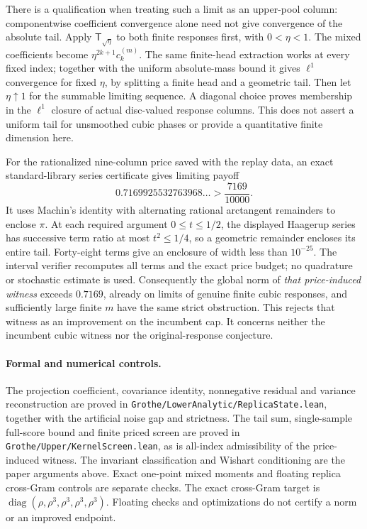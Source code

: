 \documentclass[11pt]{article}
\begin{document}
There is a qualification when treating such a limit as an upper-pool column:
componentwise coefficient convergence alone need not give convergence of the
absolute tail. Apply $\mathsf T_{\sqrt\eta}$ to both finite responses first,
with $0<\eta<1$. The mixed coefficients become
$\eta^{2k+1}c_k^{(m)}$. The same finite-head extraction works at every fixed
index; together with the uniform absolute-mass bound it gives $\ell^1$
convergence for fixed $\eta$, by splitting a finite head and a geometric tail.
Then let $\eta\uparrow1$ for the summable limiting sequence. A diagonal choice
proves membership in the $\ell^1$ closure of actual disc-valued response columns.
This does not assert a uniform tail for unsmoothed cubic phases or provide a
quantitative finite dimension here.

For the rationalized nine-column price saved with the replay data, an exact
standard-library series certificate gives limiting payoff
\[
 0.7169925532763968\ldots>\frac{7169}{10000}.
\]
It uses Machin's identity with alternating rational arctangent remainders to
enclose $\pi$. At each required argument $0\le t\le1/2$, the displayed
Haagerup series has successive term ratio at most $t^2\le1/4$, so a geometric
remainder encloses its entire tail. Forty-eight terms give an enclosure of
width less than $10^{-25}$. The interval verifier recomputes all terms and
the exact price budget; no quadrature or stochastic estimate is used.
Consequently the global norm of \emph{that price-induced witness} exceeds
$0.7169$, already on limits of genuine finite cubic responses, and sufficiently
large finite $m$ have the same strict obstruction. This rejects that witness
as an improvement on the incumbent cap. It concerns neither the incumbent
cubic witness nor the original-response conjecture.

\paragraph{Formal and numerical controls.}
The projection coefficient, covariance identity, nonnegative residual and
variance reconstruction are proved in
\texttt{Grothe/LowerAnalytic/ReplicaState.lean}, together with the artificial
noise gap and strictness. The tail sum, single-sample full-score bound and
finite priced screen are proved in
\texttt{Grothe/Upper/KernelScreen.lean}, as is all-index admissibility of the
price-induced witness. The invariant classification
and Wishart conditioning are the paper arguments above. Exact one-point mixed
moments and floating replica cross-Gram controls are separate checks. The exact
cross-Gram target is
$\operatorname{diag}(\rho,\rho^3,\rho^3,\rho^3,\rho^3)$.
Floating checks and optimizations do not certify a norm or an improved endpoint.
\end{document}
